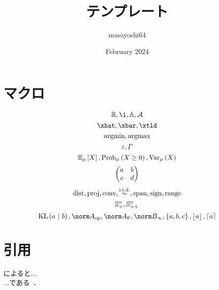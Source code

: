 \documentclass[11pt,a4paper]{article}
\title{テンプレート}
\author{masayoshi64}
\date{February 2024}
\begin{document}
\maketitle

\section{マクロ}
\[\R, \1, \Abb, \cA\]
\[\xhat, \xbar, \xtld\]
\[\operatorname*{argmin}, \operatorname*{argmax}\]
\[\varepsilon, \varGamma\]
\[\Expec[\mu]{X}, \Prob[\mu]{X \geq 0}, \Var[\mu]{X}\]
\[\begin{pmatrix} 
        a & b                \\
        c & d
     \end{pmatrix}\]
\[\mathrm{dist}, \mathrm{proj}, \mathrm{conv}, \overset{\mathrm{i.i.d.}}{\sim}, \mathrm{span}, \mathrm{sign}, \mathrm{range} \]
\[\mathbb{S}^{n}_+, \mathbb{S}^{n}_{++}\]
\[\kl{a}{b}, \opnorm{A}, \frobnorm{A}, \infnorm{B}, \set{a, b, c}, \floor{a}, \ceil{a}\]

\section{引用}
\cite{jacot2018neural}によると...\\
...である~\cite{rafailov2023direct}．



\end{document}
